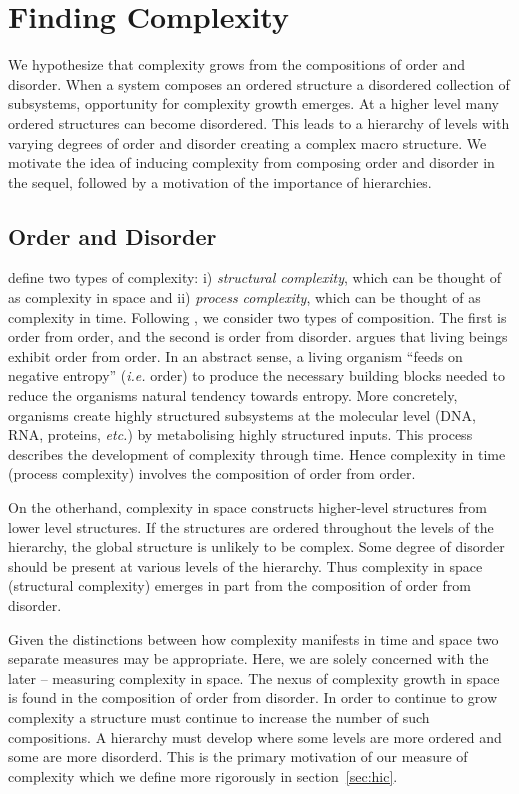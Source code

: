 \section{Finding Complexity}
\label{sec:finding_complexity}

We hypothesize that complexity grows from the compositions of order and
disorder.  When a system composes an ordered structure a disordered collection of 
subsystems, opportunity for complexity growth emerges. At a higher level many
ordered structures can become disordered. This leads to a hierarchy of levels
with varying degrees of order and disorder creating a complex macro structure.
We motivate the idea of inducing complexity from composing order and disorder
in the sequel, followed by a motivation of the importance of hierarchies. 

\subsection{Order and Disorder}

\citet{adami2002complexity} define two types of complexity: i) \emph{structural
complexity}, which can be thought of as complexity in space and ii)
\emph{process complexity}, which can be thought of as complexity in time.
Following \citet{schrodinger1944}, we consider two types of composition. The
first is order from order, and the second is order from disorder.  \citet[chap.
6]{schrodinger1944} argues that living beings exhibit order from order. In an
abstract sense, a living organism ``feeds on negative entropy'' (\emph{i.e.}
order) to produce the necessary building blocks needed to reduce the organisms
natural tendency towards entropy. More concretely, organisms create highly
structured subsystems at the molecular level (DNA, RNA, proteins, \emph{etc.})
by metabolising highly structured inputs. This process describes the
development of complexity through time. Hence complexity in time (process
complexity) involves the composition of order from order. 

On the otherhand, complexity in space constructs higher-level structures from
lower level structures. If the structures are ordered throughout the levels of
the hierarchy, the global structure is unlikely to be complex. Some degree of
disorder should be present at various levels of the hierarchy. Thus complexity
in space (structural complexity) emerges in part from the composition of order
from disorder.

Given the distinctions between how complexity manifests in time and space two
separate measures may be appropriate. Here, we are solely concerned with the
later -- measuring complexity in space. The nexus of complexity growth in space
is found in the composition of order from disorder. In order to continue to
grow complexity a structure must continue to increase the number of such
compositions. A hierarchy must develop where some levels are more ordered and
some are more disorderd. This is the primary motivation of our measure of
complexity which we define more rigorously in section~\ref{sec:hic}.

